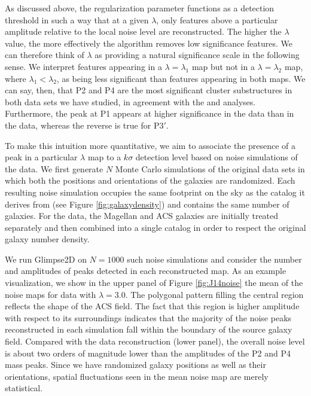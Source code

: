 \documentclass[iop,twocolappendix]{emulateapj}
\newcommand{\cta}[1]{\citetalias{#1}}
\begin{document}
As discussed above, the regularization parameter functions as a detection threshold in such a way 
that at a given $\lambda$, only features above a particular amplitude relative to the local 
noise level are reconstructed. The higher the $\lambda$ value, the more effectively the algorithm 
removes low significance features. We can therefore think of $\lambda$ as providing a natural
significance scale in the following sense. We interpret features appearing in a $\lambda=\lambda_1$ 
map but not in a $\lambda=\lambda_2$ map, where $\lambda_1 < \lambda_2$, as being less significant than
features appearing in both maps. We can say, then, that P2 and P4 are the most significant cluster 
substructures in both data sets we have studied, in agreement with the \cta{C12} and 
\cta{J14} analyses. Furthermore, the peak at P1 appears at higher significance in the \cta{C12} data
than in the \cta{J14} data, whereas the reverse is true for P3$'$.

To make this intuition more quantitative, we aim to associate the presence of a peak in a particular 
$\lambda$ map to a $k\sigma$ detection level based on noise simulations of the data. 
We first generate $N$ Monte Carlo simulations of the
original data sets in which both the positions and orientations of the galaxies are randomized. 
Each resulting noise simulation occupies the same footprint on the sky as the catalog it derives
from (see Figure \ref{fig:galaxydensity}) and contains the same number of galaxies. For the 
\cta{C12} data, the Magellan and ACS galaxies are initially treated separately and then combined 
into a single catalog in order to respect the original galaxy number density.

We run Glimpse2D on $N=1000$ such noise simulations and consider the number and amplitudes of peaks 
detected in each reconstructed map. As an example visualization, we show in the upper panel of 
Figure \ref{fig:J14noise} the mean of the noise maps for \cta{J14} data with $\lambda=3.0$. 
The polygonal pattern filling the central region reflects the shape of the ACS field. The fact that this region is
higher amplitude with respect to its surroundings indicates that the majority of the noise peaks reconstructed 
in each simulation fall within the boundary of the source galaxy field. Compared with the data reconstruction
(lower panel), the overall noise level is about two orders of magnitude lower than the amplitudes of the P2 
and P4 mass peaks. Since we have randomized galaxy positions as well as their orientations, spatial 
fluctuations seen in the mean noise map are merely statistical.
\end{document}
